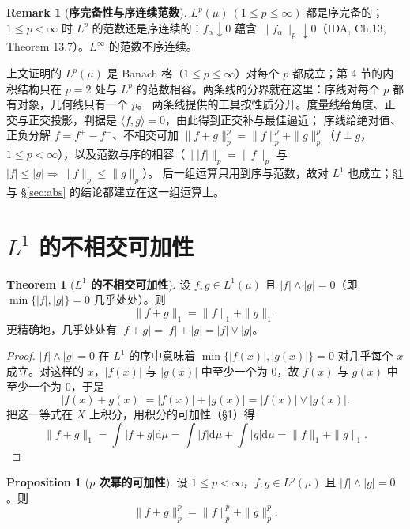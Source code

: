\documentclass[oneside]{book}
\theoremstyle{definition}
\newcommand{\dd}{\mathrm{d}}
\newcommand{\inner}[2]{\langle #1,#2\rangle}
\theoremstyle{definition}
\newtheorem{proposition}{Proposition}[section]
\newtheorem{theorem}{Theorem}[section]
\newtheorem{remark}{Remark}[section]
\begin{document}
	\begin{remark}[\bfseries{序完备性与序连续范数}]
		$L^{p}(\mu)\ (1\leqslant p\leqslant\infty)$ 都是序完备的；$1\leqslant p<\infty$ 时 $L^{p}$ 的范数还是序连续的：$f_{\alpha}\downarrow0$ 蕴含 $\|f_{\alpha}\|_{p}\downarrow0$（IDA, Ch.13, Theorem 13.7）。$L^{\infty}$ 的范数不序连续。
	\end{remark}
	
	\begin{link}[序线在这里成形]
		上文证明的 $L^{p}(\mu)$ 是 Banach 格（$1\leqslant p\leqslant\infty$）对每个 $p$ 都成立；第 4 节的内积结构只在
		$p=2$ 处与 $L^{p}$ 的范数相容。两条线的分界就在这里：序线对每个 $p$ 都有对象，几何线只有一个 $p$。
		两条线提供的工具按性质分开。度量线给角度、正交与正交投影，判据是 $\inner{f}{g}=0$，由此得到正交补与最佳逼近；
		序线给绝对值、正负分解 $f=f^{+}-f^{-}$、不相交可加 $\|f+g\|_{p}^{p}=\|f\|_{p}^{p}+\|g\|_{p}^{p}$（$f\perp g$，
		$1\leqslant p<\infty$），以及范数与序的相容（$\big\||f|\big\|_{p}=\|f\|_{p}$ 与 $|f|\leqslant|g|\Rightarrow\|f\|_{p}\leqslant\|g\|_{p}$）。
		后一组运算只用到序与范数，故对 $L^{1}$ 也成立；\S\ref{sec:l1} 与 \S\ref{sec:abs} 的结论都建立在这一组运算上。
	\end{link}
	
	\section{$L^{1}$ 的不相交可加性}\label{sec:l1}
	
	\begin{theorem}[\bfseries{$L^{1}$ 的不相交可加性}]
		设 $f,g\in L^{1}(\mu)$ 且 $|f|\wedge|g|=0$（即 $\min\{|f|,|g|\}=0$ 几乎处处）。则
		\[
		\|f+g\|_{1}=\|f\|_{1}+\|g\|_{1}.
		\]
		更精确地，几乎处处有 $|f+g|=|f|+|g|=|f|\vee|g|$。
	\end{theorem}
	
	\begin{proof}
		$|f|\wedge|g|=0$ 在 $L^{1}$ 的序中意味着 $\min\{|f(x)|,|g(x)|\}=0$ 对几乎每个 $x$ 成立。对这样的 $x$，$|f(x)|$ 与 $|g(x)|$ 中至少一个为 $0$，故 $f(x)$ 与 $g(x)$ 中至少一个为 $0$，于是
		\[
		|f(x)+g(x)|=|f(x)|+|g(x)|=|f(x)|\vee|g(x)| .
		\]
		把这一等式在 $X$ 上积分，用积分的可加性（\S 1）得
		\[
		\|f+g\|_{1}=\int|f+g|\dd\mu=\int|f|\dd\mu+\int|g|\dd\mu=\|f\|_{1}+\|g\|_{1}.
		\]
	\end{proof}
	
	\begin{proposition}[\bfseries{$p$ 次幂的可加性}]
		设 $1\leqslant p<\infty$，$f,g\in L^{p}(\mu)$ 且 $|f|\wedge|g|=0$。则
		\[
		\|f+g\|_{p}^{p}=\|f\|_{p}^{p}+\|g\|_{p}^{p}.
		\]
	\end{proposition}
	
\end{document}
